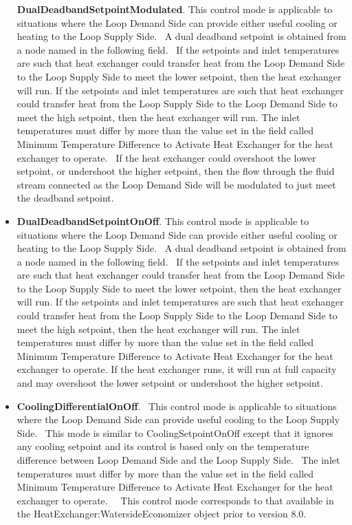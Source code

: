 \begin{itemize}
  \textbf{DualDeadbandSetpointModulated}. This control mode is applicable to situations where the Loop Demand Side can provide either useful cooling or heating to the Loop Supply Side.~ A dual deadband setpoint is obtained from a node named in the following field.~ If the setpoints and inlet temperatures are such that heat exchanger could transfer heat from the Loop Demand Side to the Loop Supply Side to meet the lower setpoint, then the heat exchanger will run. If the setpoints and inlet temperatures are such that heat exchanger could transfer heat from the Loop Supply Side to the Loop Demand Side to meet the high setpoint, then the heat exchanger will run. The inlet temperatures must differ by more than the value set in the field called Minimum Temperature Difference to Activate Heat Exchanger for the heat exchanger to operate.~ If the heat exchanger could overshoot the lower setpoint, or undershoot the higher setpoint, then the flow through the fluid stream connected as the Loop Demand Side will be modulated to just meet the deadband setpoint.
\item
  \textbf{DualDeadbandSetpointOnOff}. This control mode is applicable to situations where the Loop Demand Side can provide either useful cooling or heating to the Loop Supply Side.~ A dual deadband setpoint is obtained from a node named in the following field.~ If the setpoints and inlet temperatures are such that heat exchanger could transfer heat from the Loop Demand Side to the Loop Supply Side to meet the lower setpoint, then the heat exchanger will run. If the setpoints and inlet temperatures are such that heat exchanger could transfer heat from the Loop Supply Side to the Loop Demand Side to meet the high setpoint, then the heat exchanger will run. The inlet temperatures must differ by more than the value set in the field called Minimum Temperature Difference to Activate Heat Exchanger for the heat exchanger to operate. If the heat exchanger runs, it will run at full capacity and may overshoot the lower setpoint or undershoot the higher setpoint.
\item
  \textbf{CoolingDifferentialOnOff}.~ This control mode is applicable to situations where the Loop Demand Side can provide useful cooling to the Loop Supply Side.~ This mode is similar to CoolingSetpointOnOff except that it ignores any cooling setpoint and its control is based only on the temperature difference between Loop Demand Side and the Loop Supply Side.~ The inlet temperatures must differ by more than the value set in the field called Minimum Temperature Difference to Activate Heat Exchanger for the heat exchanger to operate.~ ~This control mode corresponds to that available in the HeatExchanger:WatersideEconomizer object prior to version 8.0.

\end{itemize}
